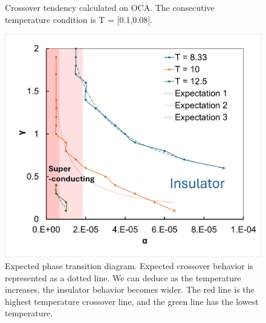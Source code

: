 \documentclass{article}[12pt]
\begin{document}
\begin{spacing}{1.5}
\begin{figure}[H]
  \caption{Crossover tendency calculated on OCA. The consecutive temperature condition is T = [0.1,0.08].}
\end{figure}
\pagebreak
\newpage
\begin{figure}[H]
  \centerline{\includegraphics[width=12cm]{TexFigure/4/4_3_15_Expecregi.png}}
  \caption{Expected phase transition diagram. Expected crossover behavior is represented as a dotted line. 
   We can deduce as the temperature increases, the insulator behavior becomes wider. 
   The red line is the highest temperature crossover line, and the green line has the lowest temperature.}
  \end{figure}
\vfill


\pagebreak
\newpage

\end{spacing}
\end{document}
